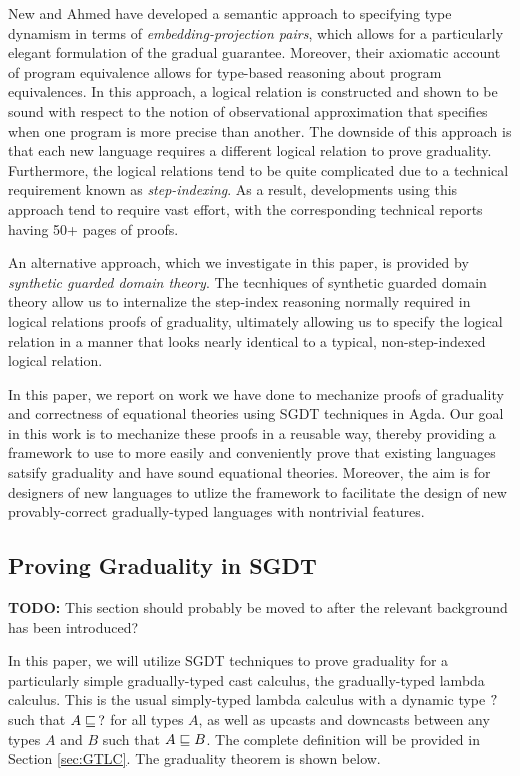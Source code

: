 New and Ahmed \cite{new-ahmed2018}
have developed a semantic approach to specifying type dynamism in terms of
\emph{embedding-projection pairs}, which allows for a particularly elegant formulation of the
gradual guarantee.
Moreover, their axiomatic account of program equivalence allows for type-based reasoning
about program equivalences.
%
In this approach, a logical relation is constructed and shown to be sound with respect to
the notion of observational approximation that specifies when one program is more precise than another.
The downside of this approach is that each new language requires a different logical relation
to prove graduality. Furthermore, the logical relations tend to be quite complicated due
to a technical requirement known as \emph{step-indexing}.
As a result, developments using this approach tend to require vast effort, with the
corresponding technical reports having 50+ pages of proofs.

An alternative approach, which we investigate in this paper, is provided by
\emph{synthetic guarded domain theory}.
The tecnhiques of synthetic guarded domain theory allow us to internalize the
step-index reasoning normally required in logical relations proofs of graduality,
ultimately allowing us to specify the logical relation in a manner that looks nearly
identical to a typical, non-step-indexed logical relation.

In this paper, we report on work we have done to mechanize proofs of graduality and
correctness of equational theories using SGDT techniques in Agda.
Our goal in this work is to mechanize these proofs in a reusable way,
thereby providing a framework to use to more easily and
conveniently prove that existing languages satsify graduality and have
sound equational theories. Moreover, the aim is for designers of new languages
to utlize the framework to facilitate the design of new provably-correct
gradually-typed languages with nontrivial features.


\subsection{Proving Graduality in SGDT}
\textbf{TODO:} This section should probably be moved to after the relevant background has been introduced?


In this paper, we will utilize SGDT techniques to prove graduality for a particularly
simple gradually-typed cast calculus, the gradually-typed lambda calculus.
This is the usual simply-typed lambda calculus with a dynamic type $?$ such that
$A \sqsubseteq\, ?$ for all types $A$, as well as upcasts and downcasts between any types
$A$ and $B$ such that $A \sqsubseteq B$. The complete definition will be provided in
Section \ref{sec:GTLC}.
The graduality theorem is shown below.


